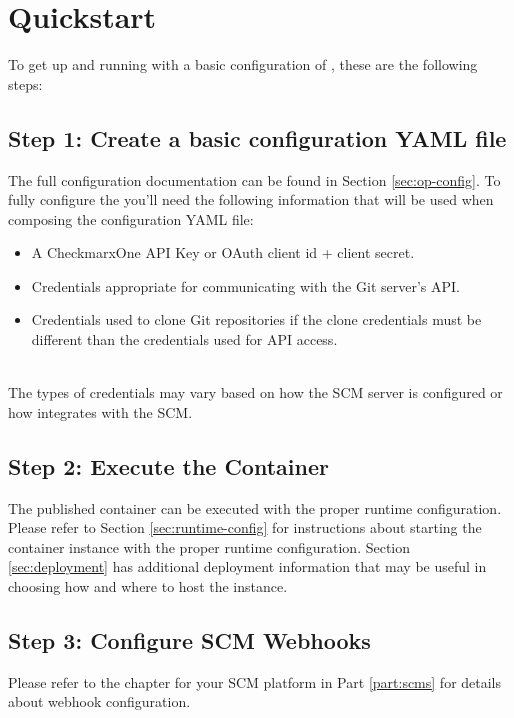 \chapter{Quickstart}

To get up and running with a basic configuration of \cxoneflow, these are the following steps:


\section{Step 1: Create a basic configuration YAML file}

The full configuration documentation can be found in Section \ref{sec:op-config}. To fully configure the \cxoneflow you'll need
the following information that will be used when composing the configuration YAML file:

\begin{itemize}
    \item A CheckmarxOne API Key or OAuth client id + client secret.
    \item Credentials appropriate for communicating with the Git server's API.
    \item Credentials used to clone Git repositories if the clone credentials must be different than the credentials used for API access.
\end{itemize}

\noindent\\The types of credentials may vary based on how the SCM server is configured or how \cxoneflow
integrates with the SCM.

\section{Step 2: Execute the \cxoneflow Container}

The published \cxoneflow container can be executed with the proper runtime configuration.  Please refer
to Section \ref{sec:runtime-config} for instructions about starting the \cxoneflow container instance with
the proper runtime configuration. Section \ref{sec:deployment} has additional deployment information that
may be useful in choosing how and where to host the \cxoneflow instance.


\section{Step 3: Configure SCM Webhooks}

Please refer to the chapter for your SCM platform in Part \ref{part:scms} for details about webhook configuration.


